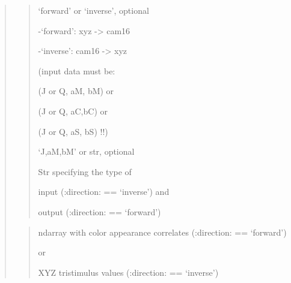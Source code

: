\documentclass[letterpaper,10pt,english]{sphinxmanual}
\begin{document}
\begin{fulllineitems}
\begin{quote}
\begin{description}
\begin{quote}
\begin{description}
\item[{direction}] \leavevmode
\begin{DUlineblock}{0em}
\item[] ‘forward’ or ‘inverse’, optional
\item[]
\begin{DUlineblock}{\DUlineblockindent}
\item[] -‘forward’: xyz -\textgreater{} cam16
\item[] -‘inverse’: cam16 -\textgreater{} xyz 
\item[]
\begin{DUlineblock}{\DUlineblockindent}
\item[] (input data must be:
\item[]
\begin{DUlineblock}{\DUlineblockindent}
\item[] (J or Q, aM, bM) or 
\item[] (J or Q, aC,bC) or 
\item[] (J or Q, aS, bS) !!)
\end{DUlineblock}
\end{DUlineblock}
\end{DUlineblock}
\end{DUlineblock}

\item[{outin}] \leavevmode
\begin{DUlineblock}{0em}
\item[] ‘J,aM,bM’ or str, optional
\item[] Str specifying the type of 
\item[]
\begin{DUlineblock}{\DUlineblockindent}
\item[] input (:direction: == ‘inverse’) and 
\item[] output (:direction: == ‘forward’)
\end{DUlineblock}
\end{DUlineblock}

\end{description}\end{quote}

\item[{Returns:}] \leavevmode\begin{quote}\begin{description}
\item[{returns}] \leavevmode
\begin{DUlineblock}{0em}
\item[] ndarray with color appearance correlates (:direction: == ‘forward’) 
\item[]
\begin{DUlineblock}{\DUlineblockindent}
\item[] or 
\end{DUlineblock}
\item[] XYZ tristimulus values (:direction: == ‘inverse’)
\end{DUlineblock}


\end{description}
\end{quote}
\end{description}
\end{quote}
\end{fulllineitems}
\end{document}
